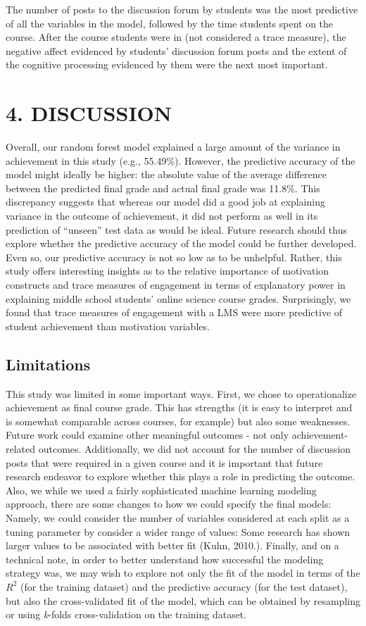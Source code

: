\documentclass[acmart]{apa6}
\theoremstyle{definition}
\theoremstyle{definition}
\theoremstyle{definition}
\theoremstyle{remark}
\begin{document}
The number of posts to the discussion forum by students was the most
predictive of all the variables in the model, followed by the time
students spent on the course. After the course students were in (not
considered a trace measure), the negative affect evidenced by students'
discussion forum posts and the extent of the cognitive processing
evidenced by them were the next most important.

\section{4. DISCUSSION}\label{discussion}

Overall, our random forest model explained a large amount of the
variance in achievement in this study (e.g., 55.49\%). However, the
predictive accuracy of the model might ideally be higher: the absolute
value of the average difference between the predicted final grade and
actual final grade was 11.8\%. This discrepancy suggests that whereas
our model did a good job at explaining variance in the outcome of
achievement, it did not perform as well in its prediction of
\enquote{unseen} test data as would be ideal. Future research should
thus explore whether the predictive accuracy of the model could be
further developed. Even so, our predictive accuracy is not so low as to
be unhelpful. Rather, this study offers interesting insights as to the
relative importance of motivation constructs and trace measures of
engagement in terms of explanatory power in explaining middle school
students' online science course grades. Surprisingly, we found that
trace measures of engagement with a LMS were more predictive of student
achievement than motivation variables.

\subsection{Limitations}\label{limitations}

This study was limited in some important ways. First, we chose to
operationalize achievement as final course grade. This has strengths (it
is easy to interpret and is somewhat comparable across courses, for
example) but also some weaknesses. Future work could examine other
meaningful outcomes - not only achievement-related outcomes.
Additionally, we did not account for the number of discussion posts that
were required in a given course and it is important that future research
endeavor to explore whether this plays a role in predicting the outcome.
Also, we while we used a fairly sophisticated machine learning modeling
approach, there are some changes to how we could specify the final
models: Namely, we could consider the number of variables considered at
each split as a tuning parameter by consider a wider range of values:
Some research has shown larger values to be associated with better fit
(Kuhn, 2010.). Finally, and on a technical note, in order to better
understand how successful the modeling strategy was, we may wish to
explore not only the fit of the model in terms of the \(R^2\) (for the
training dataset) and the predictive accuracy (for the test dataset),
but also the cross-validated fit of the model, which can be obtained by
resampling or using \emph{k}-folds cross-validation on the training
dataset.
\end{document}
